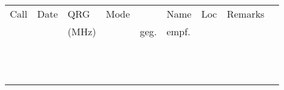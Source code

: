\documentclass[10pt,a5paper,oneside,landscape]{article}
\begin{document}
\selectfont 
{}
\begin{tabular}{
| >{\centering\arraybackslash}m{2.5cm} %
| >{\centering\arraybackslash}m{1.5cm}  %
| >{\centering\arraybackslash}m{1.5cm}  %
| >{\centering\arraybackslash}m{1.25cm}  %
| >{\centering\arraybackslash}m{.75cm}  %
| >{\centering\arraybackslash}m{.75cm}  %
| >{\centering\arraybackslash}m{2.5cm}  %
| >{\centering\arraybackslash}m{1.25cm} %
| >{\centering\arraybackslash}m{3cm} %
|}
\hline
Call &
Date &
QRG &
Mode &
\multicolumn{2}{|c|}{Rapport} &
Name &
Loc &
Remarks\\ [1ex]
 
&  & (MHz) &  & geg. & empf. & & & \\ [1ex]
\hline
&  & & &  &  & & & \\ [2ex]
\hline
&  & & &  &  & & & \\ [2ex]
\hline
&  & & &  &  & & & \\ [2ex]
\hline
&  & & &  &  & & & \\ [2ex]
\hline
&  & & &  &  & & & \\ [2ex]
\hline
&  & & &  &  & & & \\ [2ex]
\hline
&  & & &  &  & & & \\ [2ex]
\hline
&  & & &  &  & & & \\ [2ex]
\hline
&  & & &  &  & & & \\ [2ex]
\hline
&  & & &  &  & & & \\ [2ex]
\hline
&  & & &  &  & & & \\ [2ex]
\hline
&  & & &  &  & & & \\ [2ex]
\hline
\end{tabular}
\pagebreak
 
 
 
\end{document}
